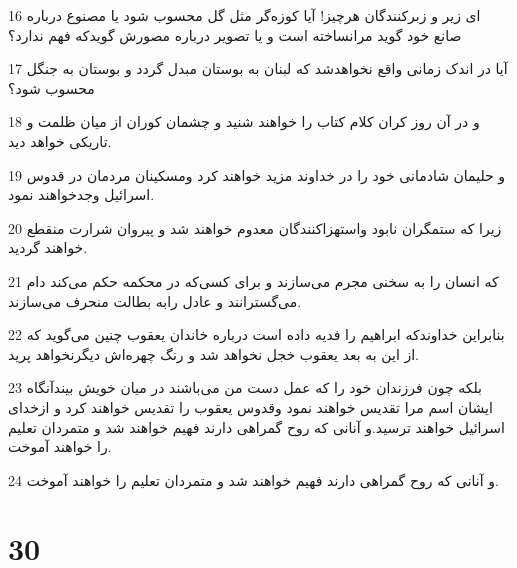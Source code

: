 \par 16 ‌ای زیر و زبرکنندگان هرچیز! آیا کوزه‌گر مثل گل محسوب شود یا مصنوع درباره صانع خود گوید مرانساخته است و یا تصویر درباره مصورش گویدکه فهم ندارد؟
\par 17 آیا در اندک زمانی واقع نخواهدشد که لبنان به بوستان مبدل گردد و بوستان به جنگل محسوب شود؟
\par 18 و در آن روز کران کلام کتاب را خواهند شنید و چشمان کوران از میان ظلمت و تاریکی خواهد دید.
\par 19 و حلیمان شادمانی خود را در خداوند مزید خواهند کرد ومسکینان مردمان در قدوس اسرائیل وجدخواهند نمود.
\par 20 زیرا که ستمگران نابود واستهزاکنندگان معدوم خواهند شد و پیروان شرارت منقطع خواهند گردید.
\par 21 که انسان را به سخنی مجرم می‌سازند و برای کسی‌که در محکمه حکم می‌کند دام می‌گسترانند و عادل رابه بطالت منحرف می‌سازند.
\par 22 بنابراین خداوندکه ابراهیم را فدیه داده است درباره خاندان یعقوب چنین می‌گوید که از این به بعد یعقوب خجل نخواهد شد و رنگ چهره‌اش دیگرنخواهد پرید.
\par 23 بلکه چون فرزندان خود را که عمل دست من می‌باشند در میان خویش بیندآنگاه ایشان اسم مرا تقدیس خواهند نمود وقدوس یعقوب را تقدیس خواهند کرد و ازخدای اسرائیل خواهند ترسید.و آنانی که روح گمراهی دارند فهیم خواهند شد و متمردان تعلیم را خواهند آموخت.
\par 24 و آنانی که روح گمراهی دارند فهیم خواهند شد و متمردان تعلیم را خواهند آموخت.
 
\chapter{30}


